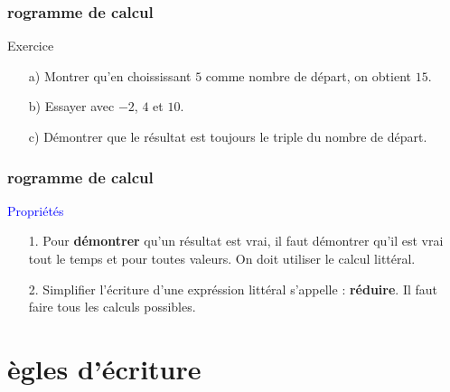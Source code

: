 \documentclass{beamer}
\begin{document}
\begin{frame}
  \frametitle{rogramme de calcul}
  \begin{exampleblock}{Exercice}
    
    \begin{multicols}{2}
      
      \begin{enumerate}
      \item[a)] Montrer qu'en choississant $5$ comme nombre de départ, on obtient $15$.
      \item[b)] Essayer avec $-2$, $4$ et $10$.
      \item[c)] Démontrer que le résultat est toujours le triple du nombre de départ.
      \end{enumerate}
      
    \end{multicols}
    

  \end{exampleblock}
\end{frame}

\begin{frame}
  \frametitle{rogramme de calcul}
  \begin{block}{\textcolor{blue}{Propriétés}}
    \begin{enumerate}
    \item[1.] Pour \textbf{démontrer} qu'un résultat est vrai, il faut démontrer qu'il est vrai tout le temps et pour toutes valeurs. On doit utiliser le calcul littéral.
    \item[2.] Simplifier l'écriture d'une expréssion littéral s'appelle : \textbf{réduire}. Il faut faire tous les calculs possibles.
    \end{enumerate}
  \end{block}
\end{frame}

\section{ ègles d'écriture}
\end{document}
